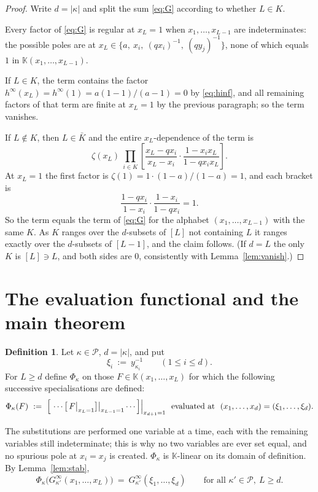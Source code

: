 \documentclass[11pt]{article}
\theoremstyle{definition}
\newtheorem{defn}[thm]{Definition}
\theoremstyle{remark}
\newcommand{\KK}{\mathbb{K}}
\newcommand{\PP}{\mathcal{P}}
\newcommand{\Gi}[1]{G^{\infty}_{#1}}
\begin{document}
\begin{proof}
Write $d=|\kappa|$ and split the sum \eqref{eq:G} according to whether $L\in K$.

Every factor of \eqref{eq:G} is regular at $x_L=1$ when $x_1,\dots,x_{L-1}$ are
indeterminates: the possible poles are at $x_L\in\{a,\ x_i,\ (qx_i)^{-1},\ (qy_j)^{-1}\}$, none
of which equals $1$ in $\KK(x_1,\dots,x_{L-1})$.

If $L\in K$, the term contains the factor $h^\infty(x_L)=h^\infty(1)=a(1-1)/(a-1)=0$ by
\eqref{eq:hinf}, and all remaining factors of that term are finite at $x_L=1$ by the previous
paragraph; so the term vanishes.

If $L\notin K$, then $L\in\bar K$ and the entire $x_L$-dependence of the term is
\[
  \zeta(x_L)\ \prod_{i\in K}\left[\frac{x_L-qx_i}{x_L-x_i}\cdot\frac{1-x_ix_L}{1-qx_ix_L}\right].
\]
At $x_L=1$ the first factor is $\zeta(1)=1\cdot(1-a)/(1-a)=1$, and each bracket is
\[
  \frac{1-qx_i}{1-x_i}\cdot\frac{1-x_i}{1-qx_i}=1 .
\]
So the term equals the term of \eqref{eq:G} for the alphabet $(x_1,\dots,x_{L-1})$ with the
same $K$. As $K$ ranges over the $d$-subsets of $[L]$ not containing $L$ it ranges exactly over
the $d$-subsets of $[L-1]$, and the claim follows. (If $d=L$ the only $K$ is $[L]\ni L$, and
both sides are $0$, consistently with Lemma~\ref{lem:vanish}.)
\end{proof}

\section{The evaluation functional and the main theorem}\label{sec:eval}

\begin{defn}\label{def:Phi}
Let $\kappa\in\PP$, $d=|\kappa|$, and put
\[
  \xi_i\ :=\ y_{\kappa_i}^{-1}\qquad (1\le i\le d).
\]
For $L\ge d$ define $\Phi_\kappa$ on those $F\in\KK(x_1,\dots,x_L)$ for which the following
successive specialisations are defined:
\[
  \Phi_\kappa(F)\ :=\
  \Bigl[\ \cdots\bigl[\,F\big|_{x_L=1}\bigr]\big|_{x_{L-1}=1}\cdots\Bigr]\Big|_{x_{d+1}=1}
  \ \ \text{evaluated at}\ \ (x_1,\dots,x_d)=(\xi_1,\dots,\xi_d).
\]
\end{defn}

The substitutions are performed one variable at a time, each with the remaining variables still
indeterminate; this is why no two variables are ever set equal, and no spurious pole at
$x_i=x_j$ is created. $\Phi_\kappa$ is $\KK$-linear on its domain of definition. By
Lemma~\ref{lem:stab},
\begin{equation}\label{eq:PhiG}
  \Phi_\kappa\bigl(\Gi{\kappa'}(x_1,\dots,x_L)\bigr)
  \ =\ \Gi{\kappa'}(\xi_1,\dots,\xi_d)
  \qquad\text{for all }\kappa'\in\PP,\ L\ge d .
\end{equation}
\end{document}
